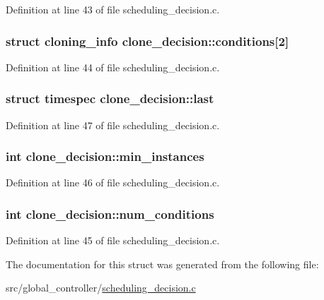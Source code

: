 Definition at line 43 of file scheduling\-\_\-decision.\-c.

\hypertarget{structclone__decision_ae84268034a0e7757434e248585ab3dbe}{
\subsubsection[{conditions}]{\setlength{\rightskip}{0pt plus 5cm}struct {\bf cloning\-\_\-info} clone\-\_\-decision\-::conditions\mbox{[}2\mbox{]}}}\label{structclone__decision_ae84268034a0e7757434e248585ab3dbe}


Definition at line 44 of file scheduling\-\_\-decision.\-c.

\hypertarget{structclone__decision_a05c1d1a8a5d670647dfde1e854ffb82b}{
\subsubsection[{last}]{\setlength{\rightskip}{0pt plus 5cm}struct timespec clone\-\_\-decision\-::last}}\label{structclone__decision_a05c1d1a8a5d670647dfde1e854ffb82b}


Definition at line 47 of file scheduling\-\_\-decision.\-c.

\hypertarget{structclone__decision_ad16c65d3fc8367b519b479127b47d281}{
\subsubsection[{min\-\_\-instances}]{\setlength{\rightskip}{0pt plus 5cm}int clone\-\_\-decision\-::min\-\_\-instances}}\label{structclone__decision_ad16c65d3fc8367b519b479127b47d281}


Definition at line 46 of file scheduling\-\_\-decision.\-c.

\hypertarget{structclone__decision_acff7bab31412f4ef8029ab063cc4a72b}{
\subsubsection[{num\-\_\-conditions}]{\setlength{\rightskip}{0pt plus 5cm}int clone\-\_\-decision\-::num\-\_\-conditions}}\label{structclone__decision_acff7bab31412f4ef8029ab063cc4a72b}


Definition at line 45 of file scheduling\-\_\-decision.\-c.



The documentation for this struct was generated from the following file\-:\begin{DoxyCompactItemize}
\item 
src/global\-\_\-controller/\hyperlink{scheduling__decision_8c}{scheduling\-\_\-decision.\-c}\end{DoxyCompactItemize}
